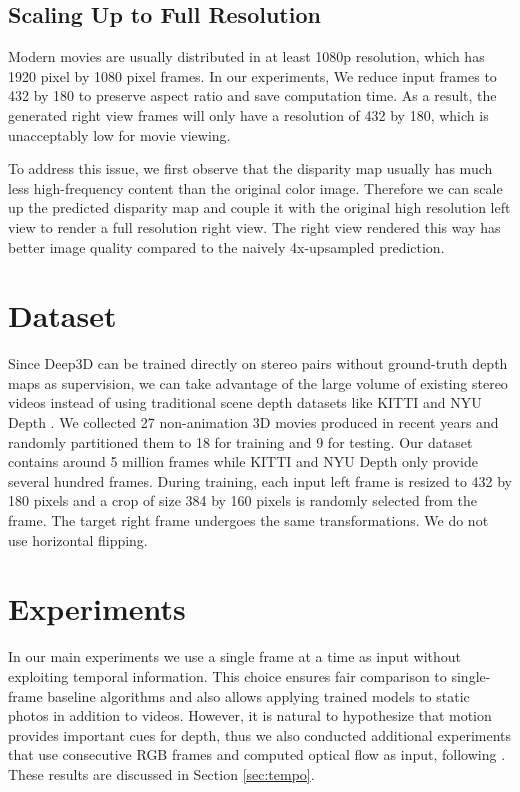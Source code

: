 \documentclass[runningheads]{llncs}
\begin{document}
\subsection{Scaling Up to Full Resolution}\label{sec:scale}
Modern movies are usually distributed in at least 1080p resolution, which has 1920 pixel by 1080 pixel frames.
In our experiments, We reduce input frames to 432 by 180 to preserve aspect ratio and save computation time.
As a result, the generated right view frames will only have a resolution of 432 by 180, which is unacceptably low for movie viewing.

To address this issue, we first observe that the disparity map usually has much less high-frequency content than the original color image.
Therefore we can scale up the predicted disparity map and couple it with the original high resolution left view to render a full resolution right view.
The right view rendered this way has better image quality compared to the naively 4x-upsampled prediction.

\section{Dataset}
Since Deep3D can be trained directly on stereo pairs without ground-truth depth maps as supervision,
we can take advantage of the large volume of existing stereo videos instead of using traditional scene depth datasets like KITTI \cite{Geiger2013IJRR} and NYU Depth \cite{Silberman:ECCV12}.
We collected 27 non-animation 3D movies produced in recent years and randomly partitioned them to 18 for training and 9 for testing.
Our dataset contains around 5 million frames while KITTI and NYU Depth only provide several hundred frames.
During training, each input left frame is resized to 432 by 180 pixels and a crop of size 384 by 160 pixels is randomly selected from the frame.
The target right frame undergoes the same transformations.
We do not use horizontal flipping.

\section{Experiments}
In our main experiments we use a single frame at a time as input without exploiting temporal information.
This choice ensures fair comparison to single-frame baseline algorithms and also allows applying trained models to static photos in addition to videos.
However, it is natural to hypothesize that motion provides important cues for depth, thus we also conducted additional experiments that use consecutive RGB frames and computed optical flow as input, following \cite{wang2015towards}.
These results are discussed in Section \ref{sec:tempo}.
\end{document}
